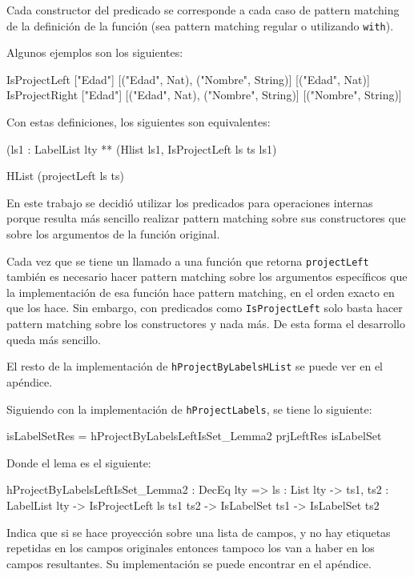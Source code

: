Cada constructor del predicado se corresponde a cada caso de pattern matching de la definición de la función (sea pattern matching regular o utilizando \texttt{with}).

Algunos ejemplos son los siguientes:

\begin{code}
IsProjectLeft ["Edad"] [("Edad", Nat), ("Nombre", String)]
  [("Edad", Nat)]
IsProjectRight ["Edad"] [("Edad", Nat), ("Nombre", String)]
  [("Nombre", String)]
\end{code}

Con estas definiciones, los siguientes son equivalentes:

\begin{code}
(ls1 : LabelList lty ** (Hlist ls1, IsProjectLeft ls ts ls1)

HList (projectLeft ls ts)
\end{code}

En este trabajo se decidió utilizar los predicados para operaciones internas porque resulta más sencillo realizar pattern matching sobre sus constructores que sobre los argumentos de la función original.

Cada vez que se tiene un llamado a una función que retorna \texttt{projectLeft} también es necesario hacer pattern matching sobre los argumentos específicos que la implementación de esa función hace pattern matching, en el orden exacto en que los hace. Sin embargo, con predicados como \texttt{IsProjectLeft} solo basta hacer pattern matching sobre los constructores y nada más. De esta forma el desarrollo queda más sencillo.

El resto de la implementación de \texttt{hProjectByLabelsHList} se puede ver en el apéndice.

Siguiendo con la implementación de \texttt{hProjectLabels}, se tiene lo siguiente:

\begin{code}
isLabelSetRes =
  hProjectByLabelsLeftIsSet_Lemma2 prjLeftRes isLabelSet
\end{code}

Donde el lema es el siguiente:

\begin{code}
hProjectByLabelsLeftIsSet_Lemma2 : DecEq lty => {ls : List lty} ->
  {ts1, ts2 : LabelList lty} -> IsProjectLeft ls ts1 ts2 ->
  IsLabelSet ts1 -> IsLabelSet ts2
\end{code}

Indica que si se hace proyección sobre una lista de campos, y no hay etiquetas repetidas en los campos originales entonces tampoco los van a haber en los campos resultantes. Su implementación se puede encontrar en el apéndice.

